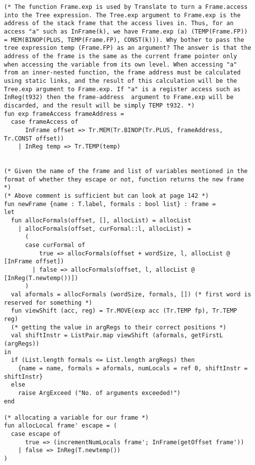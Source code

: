 \begin{verbatim}
(* The function Frame.exp is used by Translate to turn a Frame.access into the Tree expression. The Tree.exp argument to Frame.exp is the address of the stack frame that the access lives in. Thus, for an access "a" such as InFrame(k), we have Frame.exp (a) (TEMP(Frame.FP)) = MEM(BINOP(PLUS, TEMP(Frame.FP), CONST(k))). Why bother to pass the tree expression temp (Frame.FP) as an argument? The answer is that the address of the frame is the same as the current frame pointer only when accessing the variable from its own level. When accessing "a" from an inner-nested function, the frame address must be calculated using static links, and the result of this calculation will be the Tree.exp argument to Frame.exp. If "a" is a register access such as InReg(t932) then the frame-address  argument to Frame.exp will be discarded, and the result will be simply TEMP t932. *)
fun exp frameAccess frameAddress = 
  case frameAccess of
      InFrame offset => Tr.MEM(Tr.BINOP(Tr.PLUS, frameAddress, Tr.CONST offset))
    | InReg temp => Tr.TEMP(temp)


(* Given the name of the frame and list of variables mentioned in the format of whether they escape or not, function returns the new frame *)
(* Above comment is sufficient but can look at page 142 *)
fun newFrame {name : T.label, formals : bool list} : frame = 
let
  fun allocFormals(offset, [], allocList) = allocList
    | allocFormals(offset, curFormal::l, allocList) = 
      (
      case curFormal of
          true => allocFormals(offset + wordSize, l, allocList @ [InFrame offset])
        | false => allocFormals(offset, l, allocList @ [InReg(T.newtemp())])
      )
  val aformals = allocFormals (wordSize, formals, []) (* first word is reserved for something *)
  fun viewShift (acc, reg) = Tr.MOVE(exp acc (Tr.TEMP fp), Tr.TEMP reg)
  (* getting the value in argRegs to their correct positions *)
  val shiftInstr = ListPair.map viewShift (aformals, getFirstL (argRegs))
in
  if (List.length formals <= List.length argRegs) then 
    {name = name, formals = aformals, numLocals = ref 0, shiftInstr = shiftInstr}
  else 
    raise ArgExceed ("No. of arguments exceeded!")
end

(* allocating a variable for our frame *)
fun allocLocal frame' escape = (
  case escape of
      true => (incrementNumLocals frame'; InFrame(getOffset frame'))
    | false => InReg(T.newtemp())
)



\end{verbatim}
